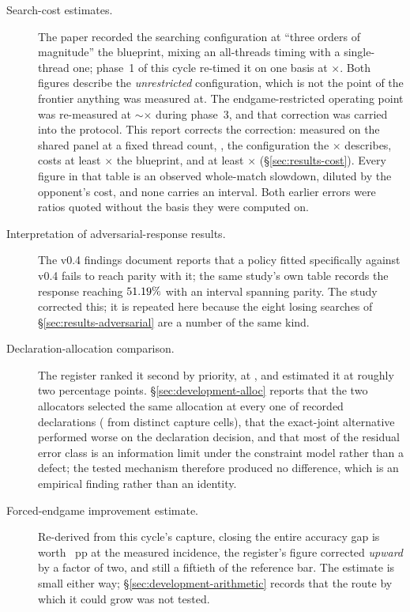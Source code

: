 \begin{description}

\item[Search-cost estimates.] The \vsix{} paper recorded the
  searching configuration at ``three orders of magnitude'' the blueprint, mixing an all-threads
  timing with a single-thread one; phase~1 of this cycle re-timed it on one basis at
  \vsevenPhaseOneCost$\times$. Both figures describe the
  \emph{unrestricted} configuration, which is not the point of the frontier anything was measured at.
  The endgame-restricted operating point was re-measured at $\sim$\vsevenCostRecorded$\times$ during
  phase~3, and that correction was carried into the protocol. This report corrects the correction: measured on the shared panel at a fixed thread count,
  \fcheap{}, the configuration the \vsevenCostRecorded$\times$ describes, costs at least
  \vsevenCostFcheapTight$\times$ the blueprint, and \sestina{} at least
  \vsevenCostFrozenTight$\times$ (\S\ref{sec:results-cost}). Every figure in that table is an
  observed whole-match slowdown, diluted by the opponent's cost, and none carries an interval. Both
  earlier errors were ratios quoted without the basis they were computed on.

\item[Interpretation of adversarial-response results.] The v0.4 findings document reports that a policy fitted
  specifically against v0.4 fails to reach parity with it; the same study's own table records the
  response reaching $51.19\%$ with an interval spanning parity. The \vsix{} study corrected
  this; it is repeated here because the eight losing searches of \S\ref{sec:results-adversarial} are
  a number of the same kind.

\item[Declaration-allocation comparison.] The register ranked it second by priority, at
  \vsevenLonePriority{}, and estimated it at roughly two percentage points.
  \S\ref{sec:development-alloc} reports that the two allocators selected the same allocation at every
  one of \vsevenLoneDeclsTotal{} recorded declarations (\vsevenLoneDeclsDistinct{} from distinct
  capture cells), that the exact-joint alternative performed worse on the declaration decision, and
  that most of the residual error class is an information limit under the constraint model rather
  than a defect; the tested mechanism therefore produced no difference, which is an empirical
  finding rather than an identity.

\item[Forced-endgame improvement estimate.]
  Re-derived from this cycle's capture, closing the entire accuracy gap is worth
  \vsevenLthirteenClose{}~pp at the measured incidence, the register's figure corrected
  \emph{upward} by a factor of two, and still a fiftieth of the reference bar. The estimate is small
  either way; \S\ref{sec:development-arithmetic} records that the route by which it could grow was
  not tested.


\end{description}

